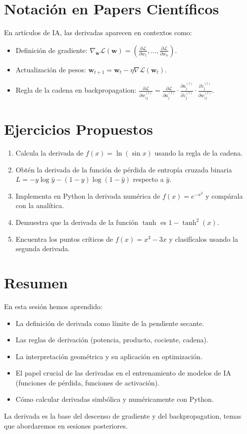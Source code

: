 \documentclass[12pt,a4paper,openany,oneside]{book}
\begin{document}
\section{Notación en Papers Científicos}
En artículos de IA, las derivadas aparecen en contextos como:
\begin{itemize}
    \item Definición de gradiente: $\nabla_{\mathbf{w}} \mathcal{L}(\mathbf{w}) = \left( \frac{\partial \mathcal{L}}{\partial w_1}, \dots, \frac{\partial \mathcal{L}}{\partial w_n} \right)$.
    \item Actualización de pesos: $\mathbf{w}_{t+1} = \mathbf{w}_t - \eta \nabla \mathcal{L}(\mathbf{w}_t)$.
    \item Regla de la cadena en backpropagation: $\frac{\partial \mathcal{L}}{\partial w_{ij}^{(l)}} = \frac{\partial \mathcal{L}}{\partial a_j^{(l)}} \cdot \frac{\partial a_j^{(l)}}{\partial z_j^{(l)}} \cdot \frac{\partial z_j^{(l)}}{\partial w_{ij}^{(l)}}$.
\end{itemize}

\section{Ejercicios Propuestos}
\begin{enumerate}
    \item Calcula la derivada de $f(x) = \ln(\sin x)$ usando la regla de la cadena.
    \item Obtén la derivada de la función de pérdida de entropía cruzada binaria $L = -y \log \hat{y} - (1-y) \log(1-\hat{y})$ respecto a $\hat{y}$.
    \item Implementa en Python la derivada numérica de $f(x) = e^{-x^2}$ y compárala con la analítica.
    \item Demuestra que la derivada de la función $\tanh$ es $1 - \tanh^2(x)$.
    \item Encuentra los puntos críticos de $f(x) = x^3 - 3x$ y clasifícalos usando la segunda derivada.
\end{enumerate}

\section{Resumen}
En esta sesión hemos aprendido:
\begin{itemize}
    \item La definición de derivada como límite de la pendiente secante.
    \item Las reglas de derivación (potencia, producto, cociente, cadena).
    \item La interpretación geométrica y su aplicación en optimización.
    \item El papel crucial de las derivadas en el entrenamiento de modelos de IA (funciones de pérdida, funciones de activación).
    \item Cómo calcular derivadas simbólica y numéricamente con Python.
\end{itemize}
La derivada es la base del descenso de gradiente y del backpropagation, temas que abordaremos en sesiones posteriores.
\end{document}
